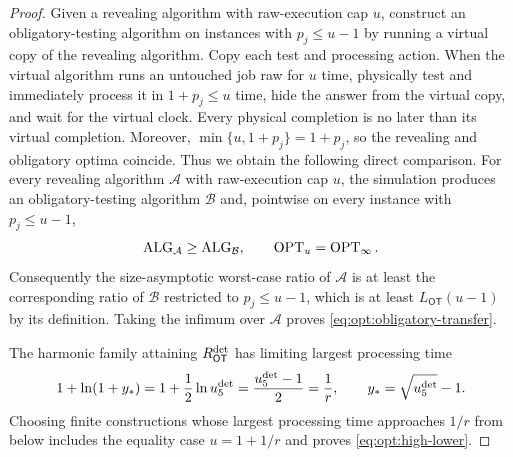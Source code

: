 \begin{proof}
Given a revealing algorithm with raw-execution cap $u$, construct an
obligatory-testing algorithm on instances with $p_j\le u-1$ by running a
virtual copy of the revealing algorithm.  Copy
each test and processing action.  When the virtual algorithm runs an
untouched job raw for $u$ time, physically test and immediately process it in
$1+p_j\le u$ time, hide the answer from the virtual copy, and wait for the
virtual clock.  Every physical completion is no later than its virtual
completion.  Moreover, $\min\{u,1+p_j\}=1+p_j$, so the revealing and
obligatory optima coincide.  Thus we obtain the following direct comparison.
For every revealing algorithm $\mathcal A$ with raw-execution cap $u$, the
simulation produces an obligatory-testing algorithm $\mathcal B$ and,
pointwise on every instance with $p_j\le u-1$,
\[
 \operatorname{ALG}_{\mathcal A}\ge\operatorname{ALG}_{\mathcal B},
 \qquad \operatorname{OPT}_u=\operatorname{OPT}_\infty.
\]
Consequently the size-asymptotic worst-case ratio of $\mathcal A$ is at
least the corresponding ratio of $\mathcal B$ restricted to
$p_j\le u-1$, which is at least $L_{\mathsf{OT}}(u-1)$ by its definition.
Taking the infimum over $\mathcal A$ proves
\cref{eq:opt:obligatory-transfer}.

The harmonic family attaining $R_{\mathsf{OT}}^{\mathrm{det}}$ has limiting largest
processing time
\begin{equation}
 1+\ln(1+y_*)
 =1+\frac12\ln u_{5}^{\mathrm{det}}
 =\frac{u_{5}^{\mathrm{det}}-1}{2}=\frac1r,
 \qquad y_*=\sqrt{u_{5}^{\mathrm{det}}}-1.
\end{equation}
Choosing finite constructions whose largest processing time approaches
$1/r$ from below includes the equality case $u=1+1/r$ and proves
\cref{eq:opt:high-lower}.
\end{proof}
